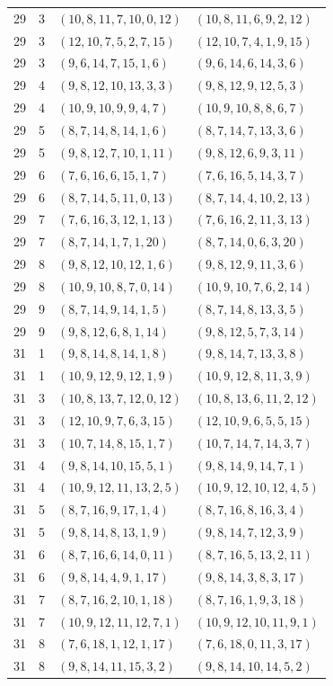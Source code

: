 \documentclass[11pt,a4paper,oneside,openany]{book}
\theoremstyle{definition}
\numberwithin{equation}{chapter}
\begin{document}
\begin{longtable}{rrll}
29&3&$(10,8,11,7,10,0,12)$&$(10,8,11,6,9,2,12)$\\
29&3&$(12,10,7,5,2,7,15)$&$(12,10,7,4,1,9,15)$\\
29&3&$(9,6,14,7,15,1,6)$&$(9,6,14,6,14,3,6)$\\
29&4&$(9,8,12,10,13,3,3)$&$(9,8,12,9,12,5,3)$\\
29&4&$(10,9,10,9,9,4,7)$&$(10,9,10,8,8,6,7)$\\
29&5&$(8,7,14,8,14,1,6)$&$(8,7,14,7,13,3,6)$\\
29&5&$(9,8,12,7,10,1,11)$&$(9,8,12,6,9,3,11)$\\
29&6&$(7,6,16,6,15,1,7)$&$(7,6,16,5,14,3,7)$\\
29&6&$(8,7,14,5,11,0,13)$&$(8,7,14,4,10,2,13)$\\
29&7&$(7,6,16,3,12,1,13)$&$(7,6,16,2,11,3,13)$\\
29&7&$(8,7,14,1,7,1,20)$&$(8,7,14,0,6,3,20)$\\
29&8&$(9,8,12,10,12,1,6)$&$(9,8,12,9,11,3,6)$\\
29&8&$(10,9,10,8,7,0,14)$&$(10,9,10,7,6,2,14)$\\
29&9&$(8,7,14,9,14,1,5)$&$(8,7,14,8,13,3,5)$\\
29&9&$(9,8,12,6,8,1,14)$&$(9,8,12,5,7,3,14)$\\
31&1&$(9,8,14,8,14,1,8)$&$(9,8,14,7,13,3,8)$\\
31&1&$(10,9,12,9,12,1,9)$&$(10,9,12,8,11,3,9)$\\
31&3&$(10,8,13,7,12,0,12)$&$(10,8,13,6,11,2,12)$\\
31&3&$(12,10,9,7,6,3,15)$&$(12,10,9,6,5,5,15)$\\
31&3&$(10,7,14,8,15,1,7)$&$(10,7,14,7,14,3,7)$\\
31&4&$(9,8,14,10,15,5,1)$&$(9,8,14,9,14,7,1)$\\
31&4&$(10,9,12,11,13,2,5)$&$(10,9,12,10,12,4,5)$\\
31&5&$(8,7,16,9,17,1,4)$&$(8,7,16,8,16,3,4)$\\
31&5&$(9,8,14,8,13,1,9)$&$(9,8,14,7,12,3,9)$\\
31&6&$(8,7,16,6,14,0,11)$&$(8,7,16,5,13,2,11)$\\
31&6&$(9,8,14,4,9,1,17)$&$(9,8,14,3,8,3,17)$\\
31&7&$(8,7,16,2,10,1,18)$&$(8,7,16,1,9,3,18)$\\
31&7&$(10,9,12,11,12,7,1)$&$(10,9,12,10,11,9,1)$\\
31&8&$(7,6,18,1,12,1,17)$&$(7,6,18,0,11,3,17)$\\
31&8&$(9,8,14,11,15,3,2)$&$(9,8,14,10,14,5,2)$\\

\end{longtable}
\end{document}
